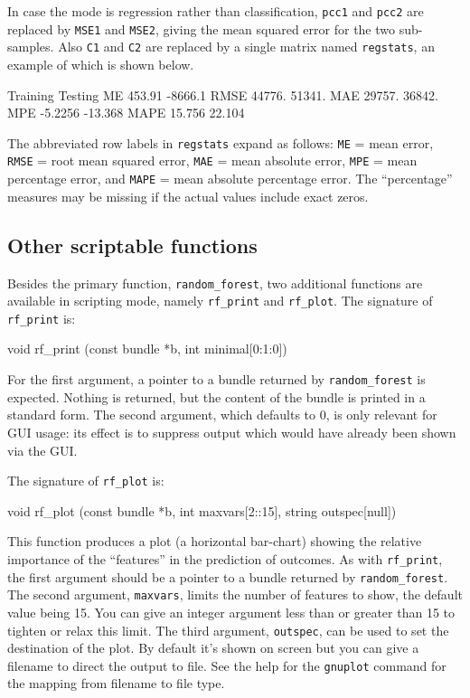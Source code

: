 \documentclass{article}
\begin{document}
In case the mode is regression rather than classification,
\texttt{pcc1} and \texttt{pcc2} are replaced by \texttt{MSE1} and
\texttt{MSE2}, giving the mean squared error for the two sub-samples.
Also \texttt{C1} and \texttt{C2} are replaced by a single matrix named
\texttt{regstats}, an example of which is shown below.
%
\begin{code}
         Training      Testing 
  ME       453.91      -8666.1 
RMSE       44776.       51341. 
 MAE       29757.       36842. 
 MPE      -5.2256      -13.368 
MAPE       15.756       22.104
\end{code}
%
The abbreviated row labels in \texttt{regstats} expand as follows:
\texttt{ME} = mean error, \texttt{RMSE} = root mean squared error,
\texttt{MAE} = mean absolute error, \texttt{MPE} = mean percentage
error, and \texttt{MAPE} = mean absolute percentage error.  The
``percentage'' measures may be missing if the actual values include
exact zeros.

\subsection{Other scriptable functions}

Besides the primary function, \texttt{random\_forest}, two additional
functions are available in scripting mode, namely \texttt{rf\_print}
and \texttt{rf\_plot}. The signature of \texttt{rf\_print} is:
%
\begin{code}
void rf_print (const bundle *b, int minimal[0:1:0])
\end{code}
For the first argument, a pointer to a bundle returned by
\texttt{random\_forest} is expected. Nothing is returned, but the
content of the bundle is printed in a standard form. The second
argument, which defaults to 0, is only relevant for GUI usage:
its effect is to suppress output which would have already been shown
via the GUI.

The signature of \texttt{rf\_plot} is:
%
\begin{code}
void rf_plot (const bundle *b, int maxvars[2::15], string outspec[null])
\end{code}
%
This function produces a plot (a horizontal bar-chart) showing the
relative importance of the ``features'' in the prediction of
outcomes. As with \texttt{rf\_print}, the first argument should be a
pointer to a bundle returned by \texttt{random\_forest}. The second
argument, \texttt{maxvars}, limits the number of features to show, the
default value being 15. You can give an integer argument less than or
greater than 15 to tighten or relax this limit. The third argument,
\texttt{outspec}, can be used to set the destination of the plot. By
default it's shown on screen but you can give a filename to direct the
output to file. See the help for the \texttt{gnuplot} command for the
mapping from filename to file type.
\end{document}
